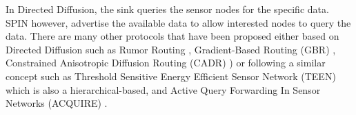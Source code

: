 In Directed Diffusion, the sink queries the sensor nodes for the specific data. SPIN however, advertise the available data to allow interested nodes to query the data. There are many other protocols that have been proposed either based on Directed Diffusion such as Rumor Routing \cite{rumorrouting}, Gradient-Based Routing (GBR) \cite{schurgers2001energy}, Constrained Anisotropic Diffusion Routing (CADR) \cite{cadr}) or following a similar concept such as Threshold Sensitive Energy Efficient Sensor Network (TEEN) \cite{teen} which is also a hierarchical-based, and Active Query Forwarding In Sensor Networks (ACQUIRE) \cite{acquire}.




